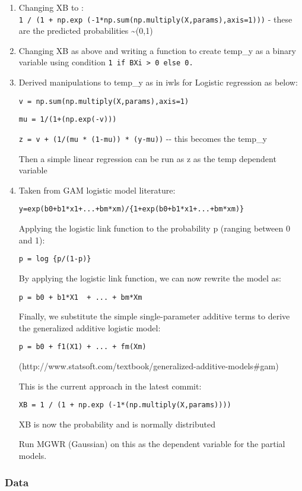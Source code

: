\documentclass[11pt]{article}
\begin{document}
\begin{enumerate}
\def\labelenumi{\arabic{enumi}.}
\item
  Changing XB to :
  \texttt{1\ /\ (1\ +\ np.exp\ (-1*np.sum(np.multiply(X,params),axis=1)))}
  - these are the predicted probabilities \textasciitilde{}(0,1)
\item
  Changing XB as above and writing a function to create temp\_y as a
  binary variable using condition
  \texttt{1\ if\ BXi\ \textgreater{}\ 0\ else\ 0.}
\item
  Derived manipulations to temp\_y as in iwls for Logistic regression as
  below:

  \texttt{v\ =\ np.sum(np.multiply(X,params),axis=1)}

  \texttt{mu\ =\ 1/(1+(np.exp(-v)))}

  \texttt{z\ =\ v\ +\ (1/(mu\ *\ (1-mu))\ *\ (y-mu))} -\/- this becomes
  the temp\_y

  Then a simple linear regression can be run as z as the temp dependent
  variable
\item
  Taken from GAM logistic model literature:

  \texttt{y=exp(b0+b1*x1+...+bm*xm)/\{1+exp(b0+b1*x1+...+bm*xm)\}}

  Applying the logistic link function to the probability p (ranging
  between 0 and 1):

  \texttt{p\textquotesingle{}\ =\ log\ \{p/(1-p)\}}

  By applying the logistic link function, we can now rewrite the model
  as:

  \texttt{p\textquotesingle{}\ =\ b0\ +\ b1*X1\ \ +\ ...\ +\ bm*Xm}

  Finally, we substitute the simple single-parameter additive terms to
  derive the generalized additive logistic model:

  \texttt{p\textquotesingle{}\ =\ b0\ +\ f1(X1)\ +\ ...\ +\ fm(Xm)}

  (http://www.statsoft.com/textbook/generalized-additive-models\#gam)

  This is the current approach in the latest commit:

  \texttt{XB\ =\ 1\ /\ (1\ +\ np.exp\ (-1*(np.multiply(X,params))))}

  XB is now the probability and is normally distributed

  Run MGWR (Gaussian) on this as the dependent variable for the partial
  models.
\end{enumerate}

    \subsubsection{Data}\label{data}
\end{document}
